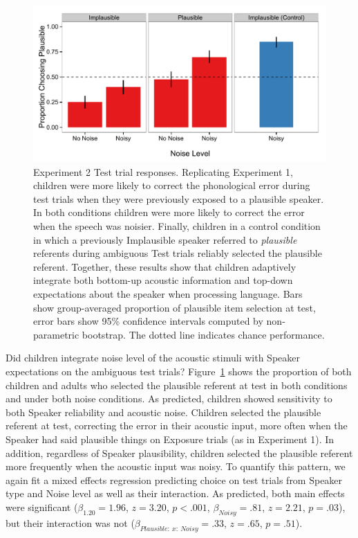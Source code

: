 \documentclass[man,floatsintext]{apa6}
\begin{document}
\begin{figure}[t]
     \centering
     \includegraphics[width=5in]{figures/exp2_results.pdf}
    \caption{Experiment 2 Test trial responses. Replicating Experiment 1, children were more likely to correct the phonological error during test trials when they were previously exposed to a plausible speaker. In both conditions children were more likely to correct the error when the speech was noisier. Finally, children in a control condition in which a previously Implausible speaker referred to \emph{plausible} referents during ambiguous Test trials reliably selected the plausible referent. Together, these results show that children adaptively integrate both bottom-up acoustic information and top-down expectations about the speaker when processing language. Bars show group-averaged proportion of plausible item selection at test, error bars show 95\% confidence intervals computed by non-parametric bootstrap. The dotted line indicates chance performance.}%
   \label{fig:exp2_results}
\end{figure}

Did children integrate noise level of the acoustic stimuli with Speaker expectations on the ambiguous test trials? Figure~\ref{fig:exp2_results} shows the proportion of both children and adults who selected the plausible referent at test in both conditions and under both noise conditions. As predicted, children showed sensitivity to both Speaker reliability and acoustic noise. Children selected the plausible referent at test, correcting the error in their acoustic input, more often when the Speaker had said plausible things on Exposure trials (as in Experiment 1). In addition, regardless of Speaker plausibility, children selected the plausible referent more frequently when the acoustic input was noisy. To quantify this pattern, we again fit a mixed effects regression predicting choice on test trials from Speaker type and Noise level as well as their interaction. As predicted, both main effects were significant ($\beta_{1.20} = 1.96$,  $z = 3.20$, $p <.001$, $\beta_{Noisy} = .81$,  $z = 2.21$, $p = .03$), but their interaction was not ($\beta_{Plausible :\ x :\ Noisy} = .33$,  $z = .65$, $p = .51$).
\end{document}

